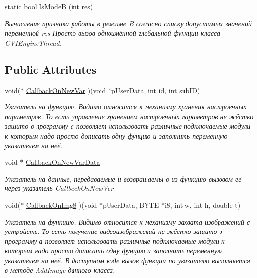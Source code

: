 \begin{DoxyCompactItemize}
static bool \hyperlink{class_c_v_i_engine_base_a7029194ddd71a7322746e962a3ed5b46}{Is\+Mode\+B} (int res)
\begin{DoxyCompactList}\small\item\em Вычисление признака работы в режиме B согласно списку допустимых значений переменной res Просто вызов одноимённой глобальной функции класса \hyperlink{class_c_v_i_engine_thread}{C\+V\+I\+Engine\+Thread}. \end{DoxyCompactList}\end{DoxyCompactItemize}
\subsection*{Public Attributes}
\begin{DoxyCompactItemize}
\item 
void($\ast$ \hyperlink{class_c_v_i_engine_base_ab3883b66e78478803c693b4ad2f5b0e7}{Callback\+On\+New\+Var} )(void $\ast$p\+User\+Data, int id, int sub\+I\+D)
\begin{DoxyCompactList}\small\item\em Указатель на функцию. Видимо относится к механизму хранения настроечных параметров. То есть управление хранением настроечных параметров не жёстко зашито в программу а позволяет использовать различные подключаемые модули к которым надо просто дописать одну фунцию и заполнить переменную указателем на неё. \end{DoxyCompactList}\item 
void $\ast$ \hyperlink{class_c_v_i_engine_base_aa0d4e70811444be165a4b9c2a4aa7aae}{Callback\+On\+New\+Var\+Data}
\begin{DoxyCompactList}\small\item\em Указатель на данные, передаваемые и возвращаемы в-\/из функцию вызовом её через указатель Callback\+On\+New\+Var \end{DoxyCompactList}\item 
void($\ast$ \hyperlink{class_c_v_i_engine_base_a4f0ddf3af6a98c243d97cbcc9be38e18}{Callback\+On\+Img8} )(void $\ast$p\+User\+Data, B\+Y\+T\+E $\ast$i8, int w, int h, double t)
\begin{DoxyCompactList}\small\item\em Указатель на функцию. Видимо относится к механизму захвата изображений с устройств. То есть получение видеоизображений не жёстко зашито в программу а позволяет использовать различные подключаемые модули к которым надо просто дописать одну фунцию и заполнить переменную указателем на неё. В доступном коде вызов функции по указателю выполняется в методе Add\+Image данного класса. \end{DoxyCompactList}\item 

\end{DoxyCompactItemize}
